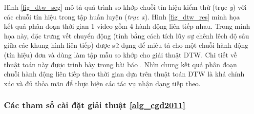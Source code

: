 Hình \ref{fig_dtw_seg} mô tả quá trình so khớp chuỗi tín hiệu kiểm thử (trục \textit{y}) với các chuỗi tín hiệu trong tập huấn luyện (\textit{trục x}). Hình \ref{fig_dtw_res} minh họa kết quả phân đoạn thời gian 1 video gồm 4 hành động liên tiếp nhau. Trong minh họa này, đặc trưng vết chuyển động (tính bằng cách tích lũy sự chênh lêch độ sâu giữa các khung hình liên tiếp) được sử dụng để miêu tả cho một chuỗi hành động (tín hiệu) đơn và dùng làm tập mẫu so khớp cho giải thuật DTW. Chi tiết về thuật toán này được trình bày trong bài báo \cite{Isabelle_Baseline}. Nhìn chung kết quả phân đoạn chuỗi hành động liên tiếp theo thời gian dựa trên thuật toán DTW là khá chính xác và đủ thỏa mãn để thực hiện các tác vụ nhận dạng tiếp theo.  

\subsubsection{Các tham số cài đặt giải thuật \ref{alg_cgd2011}}
